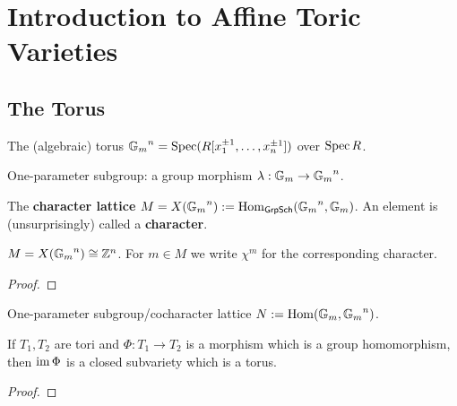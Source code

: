 \section{Introduction to Affine Toric Varieties}


\subsection{The Torus}


\begin{definition}
  \label{1-1-torus}
  \leanok

  The (algebraic) torus ${\mathbb G_m}^n = \operatorname{Spec}(R[x_1^{\pm 1}, \dotsc, x_n^{\pm 1}])$ over $\operatorname{Spec} R$.
\end{definition}


\begin{definition}
  \label{1-1-cochar}

  One-parameter subgroup: a group morphism $\lambda : {\mathbb G_m} \to {\mathbb G_m}^n$.
\end{definition}


\begin{definition}
  \label{1-1-char}
  \leanok

  The {\bf character lattice} $M = X({\mathbb G_m}^n) := \operatorname{Hom}_{\mathsf{GrpSch}}({\mathbb G_m}^n, {\mathbb G_m})$.
  An element is (unsurprisingly) called a {\bf character}.
\end{definition}


\begin{proposition}
  \label{1-1-char-torus}

  $M = X({\mathbb G_m}^n) \cong {\mathbb Z}^n$. For $m \in M$ we write $\chi^m$ for the corresponding character.
\end{proposition}
\begin{proof}

\end{proof}


\begin{definition}
  \label{1-1-cochar-lat}

  One-parameter subgroup/cocharacter lattice $N := \operatorname{Hom}({\mathbb G_m}, {\mathbb G_m}^n)$.
\end{definition}


\begin{proposition}[Proposition 1.1.1(a)]
  \label{1-1-1-group-hom-subtorus}

  If $T_1, T_2$ are tori and $\Phi : T_1 \to T_2$ is a morphism which is a group homomorphism, then $\operatorname{im} \Phi$ is a closed subvariety which is a torus.
\end{proposition}
\begin{proof}


\end{proof}


